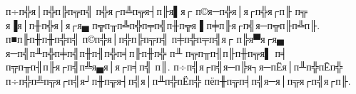 п÷п╬я│п╬п╠п╦п╣ п╬я┌п╩п╦я┤п╟я▌я┌ п©я─п╬я│я┌п╬я┌п╟ п╦ я▐я│п╫п╬я│я┌я▄ п╦п╥п╩п╬п╤п╣п╫п╦я▐ п╪п╟я┌п╣я─п╦п╟п╩п╟. п■п╟п╫п╫п╬п╣
п©п╬я│п╬п╠п╦п╣ п╪п╬п╤п╣я┌ п╠я▀я┌я▄ я─п╣п╨п╬п╪п╣п╫п╢п╬п╡п╟п╫п╬ п╨ п╦п╥п╢п╟п╫п╦я▌ п╡ п╦п╥п╢п╟я┌п╣п╩я▄я│я┌п╡п╣
п║. п÷п╣я┌п╣я─п╠я┐я─пЁя│п╨п╬пЁп╬ п÷п╬п╩п╦я┌п╣я┘п╫п╦я┤п╣я│п╨п╬пЁп╬ пёп╫п╦п╡п╣я─я│п╦я┌п╣я┌п╟.

